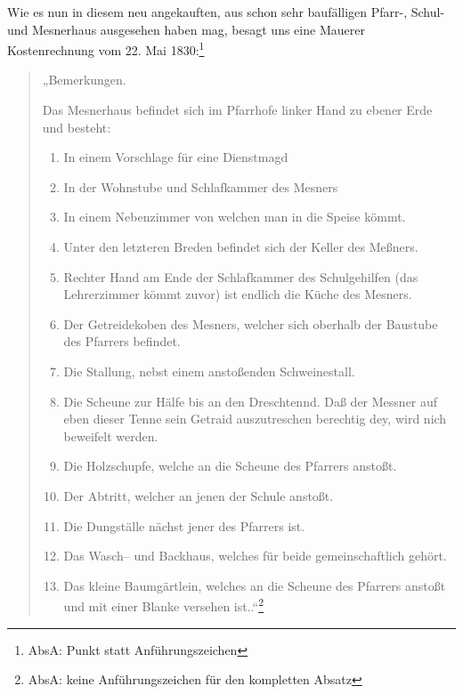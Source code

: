 \documentclass[12pt,a4paper]{book}
\begin{document}
Wie es nun in diesem neu angekauften, aus schon sehr baufälligen Pfarr-,
Schul- und Mesnerhaus ausgesehen haben mag, besagt uns eine Mauerer
Kostenrechnung vom
22. Mai 1830:\footnote{AbsA: Punkt statt Anführungszeichen}

\begin{quote}

„Bemerkungen.

Das Mesnerhaus befindet sich im Pfarrhofe linker Hand zu ebener Erde und
besteht:

\begin{enumerate}
\item In einem Vorschlage für eine Dienstmagd

\item In der Wohnstube und Schlafkammer des Mesners

\item In einem Nebenzimmer von welchen man in die Speise kömmt.

\item Unter den letzteren Breden befindet sich der Keller des Meßners.

\item Rechter Hand am Ende der Schlafkammer des Schulgehilfen (das
Lehrerzimmer kömmt zuvor) ist endlich die Küche des Mesners.

\item Der Getreidekoben des Mesners, welcher sich oberhalb der Baustube
des Pfarrers befindet.

\item Die Stallung, nebst einem anstoßenden Schweinestall.

\item Die Scheune  zur Hälfe bis an den Dreschtennd. Daß der Messner auf
eben dieser Tenne sein Getraid auszutreschen berechtig dey, wird nich
beweifelt werden.

\item Die Holzschupfe, welche an die Scheune des Pfarrers anstoßt.

\item Der Abtritt, welcher an jenen der Schule anstoßt.

\item Die Dungställe nächst jener des Pfarrers ist.

\item Das Wasch– und Backhaus, welches für beide gemeinschaftlich
gehört.

\item Das kleine Baumgärtlein, welches an die Scheune des Pfarrers
anstoßt und mit einer Blanke versehen ist..“\footnote{AbsA: keine
Anführungszeichen für den kompletten Absatz}
\end{enumerate}
\end{quote}
\end{document}
